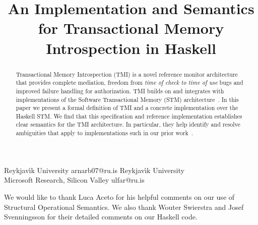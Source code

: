 \documentclass[preprint,natbib,10pt]{sigplanconf}
\begin{document}
\ifpdf
{}
\else
{}
\fi

\copyrightdata{[to be supplied]} 

\titlebanner{}        %

\title{An Implementation and Semantics for Transactional Memory Introspection in Haskell}
\subtitle{}

           {Reykjav\'{\i}k University}
           {arnarb07@ru.is}
           {Reykjav\'{\i}k University \\ Microsoft Research, Silicon Valley}
           {ulfar@ru.is}

\maketitle

\begin{abstract}
    Transactional Memory Introspection (TMI) is a novel 
    reference monitor architecture that provides 
    complete mediation,
    freedom from {\em time of check to time of use} bugs and 
    improved failure handling for authorization.
    TMI builds on and integrates with implementations of the 
    Software Transactional Memory (STM) architecture~\cite{harrisFraserSTM}. 
    In this paper we present a formal
    definition of TMI and a concrete implementation over the Haskell STM.
We find that this specification and reference implementation
    establishes clear semantics for the TMI architecture.
In particular, they help identify and resolve ambiguities 
    that apply to implementations
    such in our prior work~\cite{tmi}.
\end{abstract}











%

\acks

We would like to thank Luca Aceto for his helpful comments on our
use of Structural Operational Semantics. We also thank 
Wouter Swierstra and Josef Svenningsson for their detailed comments
on our Haskell code. 




%
%
\end{document}

